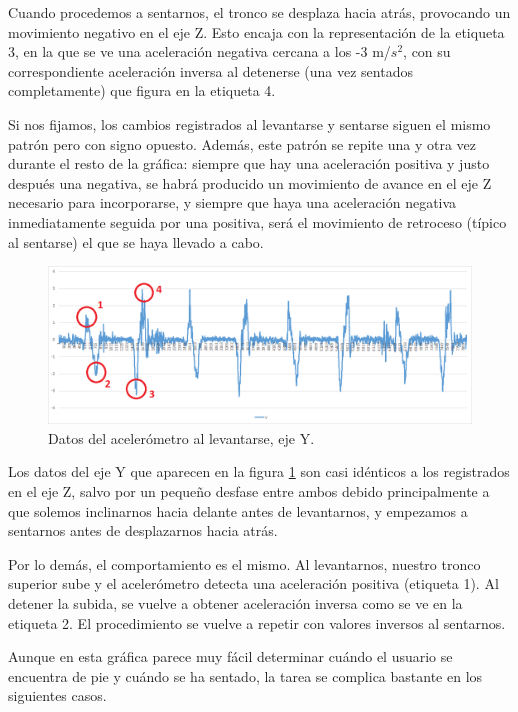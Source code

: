 Cuando procedemos a sentarnos, el tronco se desplaza hacia atrás, provocando un movimiento negativo en el eje Z. Esto encaja con la representación de la etiqueta 3, en la que se ve una aceleración negativa cercana a los -3 m/$s^{2}$, con su correspondiente aceleración inversa al detenerse (una vez sentados completamente) que figura en la etiqueta 4.

Si nos fijamos, los cambios registrados al levantarse y sentarse siguen el mismo patrón pero con signo opuesto. Además, este patrón se repite una y otra vez durante el resto de la gráfica: siempre que hay una aceleración positiva y justo después una negativa, se habrá producido un movimiento de avance en el eje Z necesario para incorporarse, y siempre que haya una aceleración negativa inmediatamente seguida por una positiva, será el movimiento de retroceso (típico al sentarse) el que se haya llevado a cabo.

\begin{figure}[H]
	\centering
	\includegraphics[scale=0.395]{imagenes/grafico_y_silla.png}
	\caption{Datos del acelerómetro al levantarse, eje Y.\label{fig:acc_4}}
\end{figure}

Los datos del eje Y que aparecen en la figura \ref{fig:acc_4} son casi idénticos a los registrados en el eje Z, salvo por un pequeño desfase entre ambos debido principalmente a que solemos inclinarnos hacia delante antes de levantarnos, y empezamos a sentarnos antes de desplazarnos hacia atrás.

Por lo demás, el comportamiento es el mismo. Al levantarnos, nuestro tronco superior sube y el acelerómetro detecta una aceleración positiva (etiqueta 1). Al detener la subida, se vuelve a obtener aceleración inversa como se ve en la etiqueta 2. El procedimiento se vuelve a repetir con valores inversos al sentarnos.

Aunque en esta gráfica parece muy fácil determinar cuándo el usuario se encuentra de pie y cuándo se ha sentado, la tarea se complica bastante en los siguientes casos.

